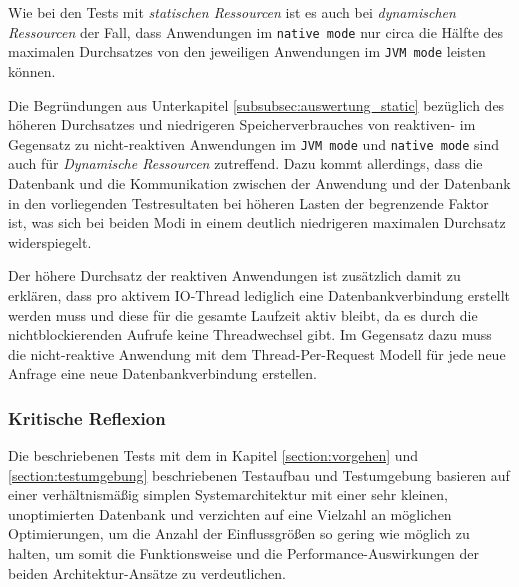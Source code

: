 Wie bei den Tests mit \textit{statischen Ressourcen} ist es auch bei \textit{dynamischen Ressourcen} der Fall, dass Anwendungen im
\verb|native mode| nur circa die Hälfte des maximalen Durchsatzes von den jeweiligen Anwendungen im \verb|JVM mode| leisten können.

Die Begründungen aus Unterkapitel \ref{subsubsec:auswertung_static} bezüglich des höheren Durchsatzes und niedrigeren Speicherverbrauches
von reaktiven- im Gegensatz zu nicht-reaktiven Anwendungen im \verb|JVM mode| und \verb|native mode| sind auch für
\textit{Dynamische Ressourcen} zutreffend.
Dazu kommt allerdings, dass die Datenbank und die Kommunikation zwischen der Anwendung und der Datenbank in den vorliegenden Testresultaten
bei höheren Lasten der begrenzende Faktor ist, was sich bei beiden Modi in einem deutlich niedrigeren maximalen Durchsatz widerspiegelt.

Der höhere Durchsatz der reaktiven Anwendungen ist zusätzlich damit zu erklären, dass pro aktivem IO-Thread lediglich eine
Datenbankverbindung erstellt werden muss und diese für die gesamte Laufzeit aktiv bleibt, da es durch die nichtblockierenden
Aufrufe keine Threadwechsel gibt. Im Gegensatz dazu muss die nicht-reaktive Anwendung mit dem Thread-Per-Request Modell
für jede neue Anfrage eine neue Datenbankverbindung erstellen.
\newpage

\subsubsection{Kritische Reflexion}
\label{subsubsec:auswertung_kritische_reflexion}
Die beschriebenen Tests mit dem in Kapitel \ref{section:vorgehen} und \ref{section:testumgebung} beschriebenen Testaufbau und Testumgebung
basieren auf einer verhältnismäßig simplen Systemarchitektur mit einer sehr kleinen, unoptimierten Datenbank und verzichten auf eine
Vielzahl an möglichen Optimierungen, um die Anzahl der Einflussgrößen so gering wie möglich zu halten, um somit die Funktionsweise und die
Performance-Auswirkungen der beiden Architektur-Ansätze zu verdeutlichen.

